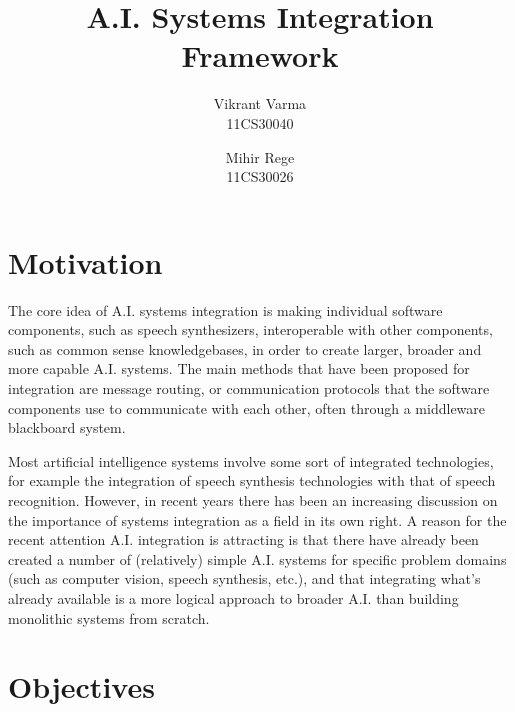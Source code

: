\documentclass[14pt]{article} %
\title{A.I. Systems Integration Framework}
\author{
	Vikrant Varma\\
	11CS30040
 \and 
	Mihir Rege\\
	11CS30026
}
\begin{document}
\maketitle

\section{Motivation}

The core idea of A.I. systems integration is making individual software components, such as speech synthesizers, interoperable with other components, such as common sense knowledgebases, in order to create larger, broader and more capable A.I. systems. The main methods that have been proposed for integration are message routing, or communication protocols that the software components use to communicate with each other, often through a middleware blackboard system.

Most artificial intelligence systems involve some sort of integrated technologies, for example the integration of speech synthesis technologies with that of speech recognition. However, in recent years there has been an increasing discussion on the importance of systems integration as a field in its own right. A reason for the recent attention A.I. integration is attracting is that there have already been created a number of (relatively) simple A.I. systems for specific problem domains (such as computer vision, speech synthesis, etc.), and that integrating what's already available is a more logical approach to broader A.I. than building monolithic systems from scratch.

\section{Objectives}
\end{document}

